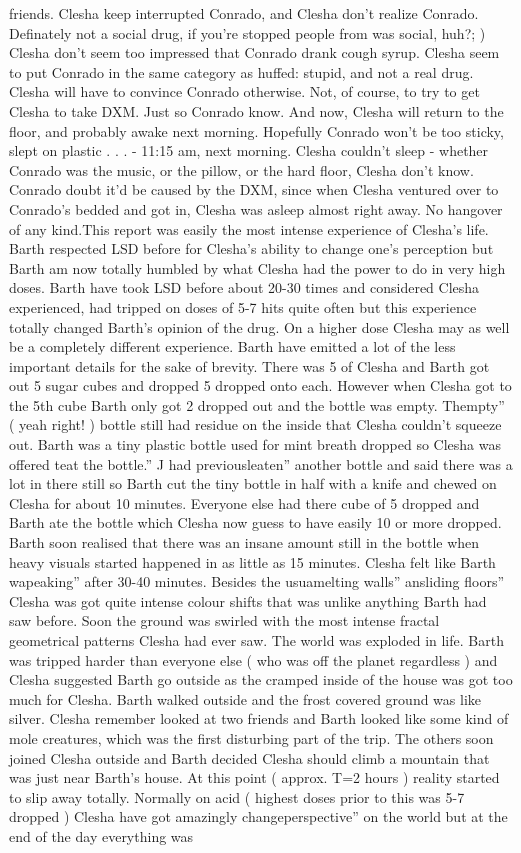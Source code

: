 \documentclass[12pt]{book}
\begin{document}
friends. Clesha keep interrupted Conrado, and Clesha don't realize Conrado. Definately not a social drug, if you're stopped people from was social, huh?; ) Clesha don't seem too impressed that Conrado drank cough syrup. Clesha seem to put Conrado in the same category as huffed: stupid, and not a real drug. Clesha will have to convince Conrado otherwise. Not, of course, to try to get Clesha to take DXM. Just so Conrado know. And now, Clesha will return to the floor, and probably awake next morning. Hopefully Conrado won't be too sticky, slept on plastic . . .  - 11:15 am, next morning. Clesha couldn't sleep - whether Conrado was the music, or the pillow, or the hard floor, Clesha don't know. Conrado doubt it'd be caused by the DXM, since when Clesha ventured over to Conrado's bedded and got in, Clesha was asleep almost right away. No hangover of any kind.This report was easily the most intense experience of Clesha's life. Barth respected LSD before for Clesha's ability to change one's perception but Barth am now totally humbled by what Clesha had the power to do in very high doses. Barth have took LSD before about 20-30 times and considered Clesha experienced, had tripped on doses of 5-7 hits quite often but this experience totally changed Barth's opinion of the drug. On a higher dose Clesha may as well be a completely different experience. Barth have emitted a lot of the less important details for the sake of brevity. There was 5 of Clesha and Barth got out 5 sugar cubes and dropped 5 dropped onto each. However when Clesha got to the 5th cube Barth only got 2 dropped out and the bottle was empty. Thempty'' ( yeah right! ) bottle still had residue on the inside that Clesha couldn't squeeze out. Barth was a tiny plastic bottle used for mint breath dropped so Clesha was offered teat the bottle.'' J had previousleaten'' another bottle and said there was a lot in there still so Barth cut the tiny bottle in half with a knife and chewed on Clesha for about 10 minutes. Everyone else had there cube of 5 dropped and Barth ate the bottle which Clesha now guess to have easily 10 or more dropped. Barth soon realised that there was an insane amount still in the bottle when heavy visuals started happened in as little as 15 minutes. Clesha felt like Barth wapeaking'' after 30-40 minutes. Besides the usuamelting walls'' ansliding floors'' Clesha was got quite intense colour shifts that was unlike anything Barth had saw before. Soon the ground was swirled with the most intense fractal geometrical patterns Clesha had ever saw. The world was exploded in life. Barth was tripped harder than everyone else ( who was off the planet regardless ) and Clesha suggested Barth go outside as the cramped inside of the house was got too much for Clesha. Barth walked outside and the frost covered ground was like silver. Clesha remember looked at two friends and Barth looked like some kind of mole creatures, which was the first disturbing part of the trip. The others soon joined Clesha outside and Barth decided Clesha should climb a mountain that was just near Barth's house. At this point ( approx. T=2 hours ) reality started to slip away totally. Normally on acid ( highest doses prior to this was 5-7 dropped ) Clesha have got amazingly changeperspective'' on the world but at the end of the day everything was 
\end{document}
